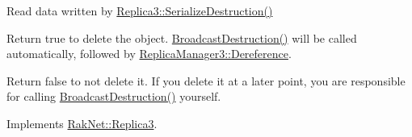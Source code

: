 Read data written by \hyperlink{class_rak_net_1_1_replica3_ac78ab07796290ede00559de9d4ceb72d}{Replica3\-::\-Serialize\-Destruction()} 

Return true to delete the object. \hyperlink{class_rak_net_1_1_replica3_a7c6a22d575326cddec3a70eb1c2568f2}{Broadcast\-Destruction()} will be called automatically, followed by \hyperlink{class_rak_net_1_1_replica_manager3_a4bd439b6f0479a20236cc29ac36a6ff2}{Replica\-Manager3\-::\-Dereference}.\par
 Return false to not delete it. If you delete it at a later point, you are responsible for calling \hyperlink{class_rak_net_1_1_replica3_a7c6a22d575326cddec3a70eb1c2568f2}{Broadcast\-Destruction()} yourself. 

Implements \hyperlink{class_rak_net_1_1_replica3_ac7fa042647ea0bf2748d194e2eefeb74}{Rak\-Net\-::\-Replica3}.

